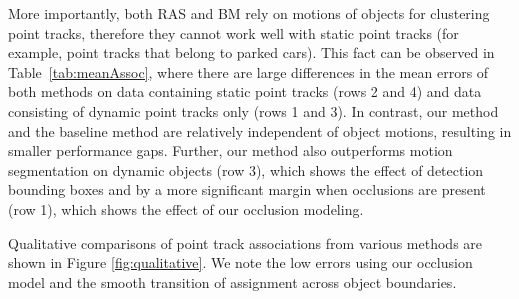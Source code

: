 More importantly, both RAS and BM rely on motions of objects for clustering point tracks, therefore they cannot work well with static point tracks (for example, point tracks that belong to parked cars). This fact can be observed in Table~\ref{tab:meanAssoc}, where there are large differences in the mean errors of both methods on data containing static point tracks (rows 2 and 4) and data consisting of dynamic point tracks only (rows 1 and 3). In contrast, our method and the baseline method are relatively independent of object motions, resulting in smaller performance gaps. Further, our method also outperforms motion segmentation on dynamic objects (row 3), which shows the effect of detection bounding boxes and by a more significant margin when occlusions are present (row 1), which shows the effect of our occlusion modeling.

Qualitative comparisons of point track associations from various methods are shown in Figure \ref{fig:qualitative}. We note the low errors using our occlusion model and the smooth transition of assignment across object boundaries.




